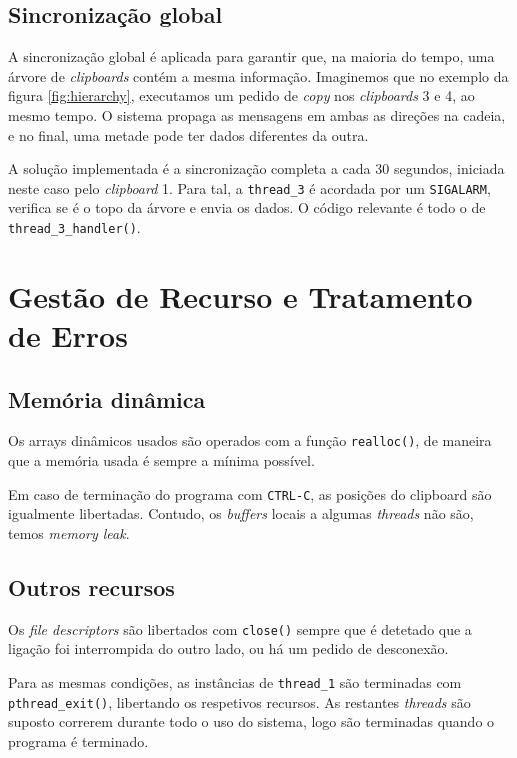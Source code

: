 \documentclass{article}
\begin{document}
\subsection{Sincronização global}

A sincronização global é aplicada para garantir que, na maioria do tempo, uma árvore de \textit{clipboards} contém a mesma informação. 
Imaginemos que no exemplo da figura \ref{fig:hierarchy}, executamos um pedido de \textit{copy} nos \textit{clipboards} 3 e 4, ao mesmo tempo. O sistema propaga as mensagens em ambas as direções na cadeia, e no final, uma metade pode ter dados diferentes da outra.

A solução implementada é a sincronização completa a cada 30 segundos, iniciada neste caso pelo \textit{clipboard} 1. 
Para tal, a \texttt{thread\_3} é acordada por um \texttt{SIGALARM}, verifica se é o topo da árvore e envia os dados.
O código relevante é todo o de \texttt{thread_3_handler()}. 


\section{Gestão de Recurso e Tratamento de Erros}

\subsection{Memória dinâmica}

Os arrays dinâmicos usados são operados com a função \texttt{realloc()}, de maneira que a memória usada é sempre a mínima possível.

Em caso de terminação do programa com \texttt{CTRL-C}, as posições do clipboard são igualmente libertadas. 
Contudo, os \textit{buffers} locais a algumas \textit{threads} não são, temos \textit{memory leak}.

\subsection{Outros recursos}

Os \textit{file descriptors} são libertados com \texttt{close()} sempre que é detetado que a ligação foi interrompida do outro lado, ou há um pedido de desconexão. 

Para as mesmas condições, as instâncias de \texttt{thread\_1} são terminadas com \texttt{pthread_exit()}, libertando os respetivos recursos. 
As restantes \textit{threads} são suposto correrem durante todo o uso do sistema, logo são terminadas quando o programa é terminado.
\end{document}
